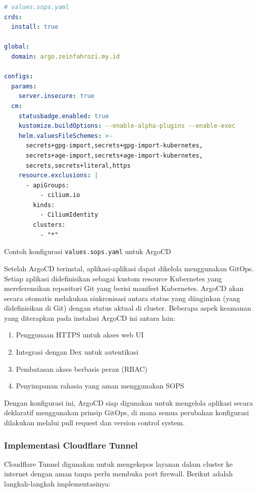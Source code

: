 \begin{table}[H]
  \centering
  \begin{minipage}{0.95\linewidth}
    \begin{lstlisting}[language=yaml, basicstyle=\footnotesize\ttfamily]
# values.sops.yaml
crds:
  install: true

global:
  domain: argo.zeinfahrozi.my.id

configs:
  params:
    server.insecure: true
  cm:
    statusbadge.enabled: true
    kustomize.buildOptions: --enable-alpha-plugins --enable-exec
    helm.valuesFileSchemes: >-
      secrets+gpg-import,secrets+gpg-import-kubernetes,
      secrets+age-import,secrets+age-import-kubernetes,
      secrets,secrets+literal,https
    resource.exclusions: |
      - apiGroups:
          - cilium.io
        kinds:
          - CiliumIdentity
        clusters:
          - "*"
    \end{lstlisting}
  \end{minipage}
  \caption{Contoh konfigurasi \texttt{values.sops.yaml} untuk ArgoCD}
  \label{tab:values-sops-yaml}
\end{table}

Setelah ArgoCD terinstal, aplikasi-aplikasi dapat dikelola menggunakan GitOps.
Setiap aplikasi didefinisikan sebagai kustom resource Kubernetes yang
mereferensikan repositori Git yang berisi manifest Kubernetes. ArgoCD akan
secara otomatis melakukan sinkronisasi antara status yang diinginkan (yang
didefinisikan di Git) dengan status aktual di cluster. Beberapa aspek keamanan
yang diterapkan pada instalasi ArgoCD ini antara lain:

\begin{enumerate}[label=\alph*.]
  \item Penggunaan HTTPS untuk akses web UI
  \item Integrasi dengan Dex untuk autentikasi
  \item Pembatasan akses berbasis peran (RBAC)
  \item Penyimpanan rahasia yang aman menggunakan SOPS
\end{enumerate}

Dengan konfigurasi ini, ArgoCD siap digunakan untuk mengelola aplikasi secara
deklaratif menggunakan prinsip GitOps, di mana semua perubahan konfigurasi
dilakukan melalui pull request dan version control system.

\subsubsection{Implementasi Cloudflare Tunnel}
Cloudflare Tunnel digunakan untuk mengekspos layanan dalam cluster ke internet
dengan aman tanpa perlu membuka port firewall. Berikut adalah langkah-langkah
implementasinya:

